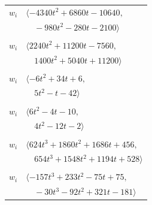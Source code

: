 \documentclass[11pt]{article}
\begin{document}
\begin{longtable}{@{}ll@{}}
$w_i$ & $\langle -4340t^{2}+6860t-10640,$\\
 & $\quad -980t^{2}-280t-2100\rangle$\\
\addlinespace[2pt]
\multicolumn{2}{@{}p{0.97\textwidth}@{}}{$i=19$, $D_i=1$, $\rho_{ij}$: $3{:}1, \allowbreak 9{:}2, \allowbreak 11{:}2, \allowbreak 12{:}1, \allowbreak 14{:}2, \allowbreak 24{:}2, \allowbreak 29{:}2, \allowbreak 33{:}1, \allowbreak 40{:}1, \allowbreak 47{:}1, \allowbreak 56{:}1, \allowbreak 60{:}1, \allowbreak 61{:}1, \allowbreak 68{:}1, \allowbreak 75{:}1, \allowbreak 77{:}2, \allowbreak 78{:}2, \allowbreak 82{:}2, \allowbreak 84{:}1, \allowbreak 96{:}2, \allowbreak 97{:}2$}\\
$w_i$ & $\langle 2240t^{2}+11200t-7560,$\\
 & $\quad 1400t^{2}+5040t+11200\rangle$\\
\addlinespace[2pt]
\multicolumn{2}{@{}p{0.97\textwidth}@{}}{$i=20$, $D_i=1$, $\rho_{ij}$: $3{:}1, \allowbreak 12{:}2, \allowbreak 16{:}1, \allowbreak 22{:}1, \allowbreak 23{:}1, \allowbreak 33{:}1, \allowbreak 39{:}1, \allowbreak 61{:}1, \allowbreak 62{:}2$}\\
$w_i$ & $\langle -6t^{2}+34t+6,$\\
 & $\quad 5t^{2}-t-42\rangle$\\
\addlinespace[2pt]
\multicolumn{2}{@{}p{0.97\textwidth}@{}}{$i=21$, $D_i=1$, $\rho_{ij}$: $6{:}1, \allowbreak 8{:}1, \allowbreak 17{:}1, \allowbreak 18{:}1, \allowbreak 25{:}2, \allowbreak 60{:}1$}\\
$w_i$ & $\langle 6t^{2}-4t-10,$\\
 & $\quad 4t^{2}-12t-2\rangle$\\
\addlinespace[2pt]
\multicolumn{2}{@{}p{0.97\textwidth}@{}}{$i=22$, $D_i=1$, $\rho_{ij}$: $1{:}2, \allowbreak 11{:}2, \allowbreak 16{:}2, \allowbreak 20{:}2, \allowbreak 51{:}2, \allowbreak 55{:}2, \allowbreak 62{:}1, \allowbreak 64{:}1$}\\
$w_i$ & $\langle 624t^{3}+1860t^{2}+1686t+456,$\\
 & $\quad 654t^{3}+1548t^{2}+1194t+528\rangle$\\
\addlinespace[2pt]
\multicolumn{2}{@{}p{0.97\textwidth}@{}}{$i=23$, $D_i=1$, $\rho_{ij}$: $0{:}2, \allowbreak 3{:}1, \allowbreak 10{:}2, \allowbreak 12{:}2, \allowbreak 18{:}2, \allowbreak 20{:}2, \allowbreak 25{:}2, \allowbreak 46{:}1, \allowbreak 56{:}2, \allowbreak 63{:}2$}\\
$w_i$ & $\langle -157t^{3}+233t^{2}-75t+75,$\\
 & $\quad -30t^{3}-92t^{2}+321t-181\rangle$\\

\end{longtable}
\end{document}
